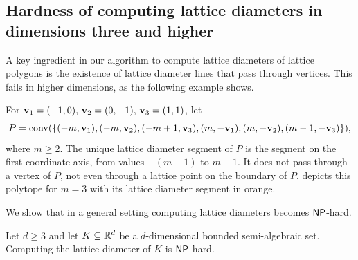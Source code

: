 \subsection{Hardness of computing lattice diameters in dimensions three and higher}\label{sec:NP-hard}

A key ingredient in our algorithm to compute lattice diameters of lattice polygons is the existence of lattice diameter lines that pass through vertices. This fails in higher dimensions, as the following example shows.

\begin{example}\label{ex:LD-3d-interior}
For $\mathbf{v}_1 = (-1,0), \, \mathbf{v}_2 = (0,-1), \, \mathbf{v}_3 = (1,1)$, let
\[
P=\operatorname{conv} (\{ (-m,\mathbf{v}_1), (-m,\mathbf{v}_2), (-m+1,\mathbf{v}_3),(m,-\mathbf{v}_1),(m,-\mathbf{v}_2),(m-1,-\mathbf{v}_3)\}),
\]
where $m \geq 2$. The unique lattice diameter segment of $P$ is the segment on the first-coordinate axis, from values $-(m-1)$ to $m-1$. It does not pass through a vertex of $P$, not even through a lattice point on the boundary of $P$.  depicts this polytope for $m=3$ with its lattice diameter segment in orange.


\end{example}

We show that in a general setting computing lattice diameters becomes $\operatorname{\mathsf{NP}}$-hard.

\begin{theorem}\label{thm:NP-hard}
     Let $d \geq 3$ and let $K \subseteq \mathbb{R}^d$ be a $d$-dimensional bounded semi-algebraic set. \mbox{Computing} the lattice diameter of $K$ is $\operatorname{\mathsf{NP}}$-hard.
\end{theorem}

